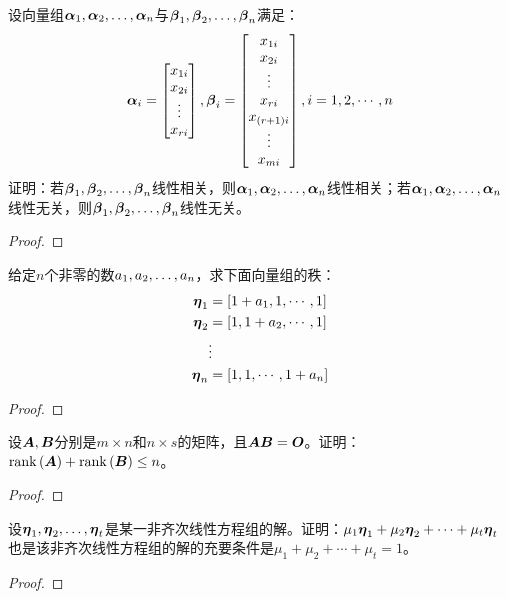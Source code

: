 \begin{problem}
设向量组\(\enums{\vecal}{n}\)与\(\enums{\vecbeta}{n}\)满足：
\begin{equation*}
    \vecal_i=\begin{bmatrix}x_{1i}\\x_{2i}\\\vdots\\x_{ri}\end{bmatrix},
    \vecbeta_i=\begin{bmatrix}x_{1i}\\x_{2i}\\\vdots\\x_{ri}\\x_{\mypar{r+1}i}\\\vdots\\x_{mi}\end{bmatrix},
    i=1,2,\cdots,n
\end{equation*}
证明：若\(\enums{\vecbeta}{n}\)线性相关，则\(\enums{\vecal}{n}\)线性相关；若\(\enums{\vecal}{n}\)线性无关，则\(\enums{\vecbeta}{n}\)线性无关。
\end{problem}
\begin{proof}

\end{proof}

\begin{problem}
给定\(n\)个非零的数\(\enums{a}{n}\)，求下面向量组的秩：
\begin{align*}
    \veceta_1 & =\mat{1+a_1,1,\cdots,1} \\
    \veceta_2 & =\mat{1,1+a_2,\cdots,1} \\
              & \vdots                  \\
    \veceta_n & =\mat{1,1,\cdots,1+a_n}
\end{align*}
\end{problem}
\begin{proof}

\end{proof}

\begin{problem}
设\(\mata,\matb\)分别是\(m\times n\)和\(n\times s\)的矩阵，且\(\mata\matb=\mato\)。证明：\(\rank{\mata}+\rank{\matb}\le n\)。
\end{problem}
\begin{proof}

\end{proof}

\begin{problem}
设\(\enums{\veceta}{t}\)是某一非齐次线性方程组的解。证明：\(\mu_1\veceta_1+\mu_2\veceta_2+\cdots+\mu_t\veceta_t\)也是该非齐次线性方程组的解的充要条件是\(\mu_1+\mu_2+\cdots+\mu_t=1\)。
\end{problem}
\begin{proof}

\end{proof}

